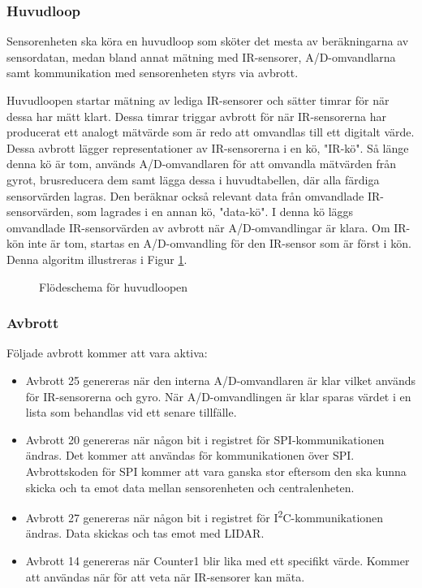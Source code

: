 \documentclass[a4paper,titlepage,12pt]{article}
\newcommand{\itc}{I\textsuperscript{2}C}
\begin{document}
    \subsubsection{Huvudloop}
    Sensorenheten ska köra en huvudloop som sköter det mesta av beräkningarna
    av sensordatan, medan bland annat mätning med IR-sensorer, A/D-omvandlarna samt
    kommunikation med sensorenheten styrs via avbrott.

    Huvudloopen startar mätning av lediga IR-sensorer och sätter timrar för när
    dessa har mätt klart. Dessa timrar triggar avbrott för när IR-sensorerna
    har producerat ett analogt mätvärde som är redo att omvandlas till ett 
	digitalt
    värde. Dessa avbrott lägger representationer av IR-sensorerna i en kö,
    "IR-kö". Så länge denna kö är tom, används A/D-omvandlaren för att
    omvandla mätvärden från gyrot, brusreducera dem samt lägga dessa i
    huvudtabellen, där alla färdiga sensorvärden lagras. Den beräknar också
    relevant data från omvandlade IR-sensorvärden, som lagrades i en annan kö,
    "data-kö". I denna kö läggs omvandlade IR-sensorvärden av avbrott när
    A/D-omvandlingar är klara. Om IR-kön inte är tom, startas en A/D-omvandling
    för den IR-sensor som är först i kön. Denna algoritm illustreras i Figur 
    \ref{fig:sensor_flow}. 

    \begin{figure}[h!]
        \caption{Flödeschema för huvudloopen\label{fig:sensor_flow}}
    \end{figure}

    \subsubsection{Avbrott}
	Följade avbrott kommer att vara aktiva:
    \begin{itemize}
        \item Avbrott 25 genereras när den interna A/D-omvandlaren är klar 
            vilket används för IR-sensorerna och gyro. När A/D-omvandlingen är klar 
            sparas värdet i en lista som behandlas vid ett senare tillfälle.
        \item Avbrott 20 genereras när någon bit i registret för SPI-kommunikationen
            ändras. Det kommer att användas för kommunikationen över SPI. Avbrottskoden för 
            SPI kommer att vara ganska stor eftersom den ska kunna skicka och ta emot data 
			mellan sensorenheten och centralenheten. 
        \item Avbrott 27 genereras när någon bit i registret för \itc{}-kommunikationen 
            ändras. Data skickas och tas emot med LIDAR. 
		\item Avbrott 14 genereras när Counter1 blir lika med ett specifikt värde. 
			Kommer att användas när för att veta när IR-sensorer kan mäta. 
    \end{itemize}
\end{document}
